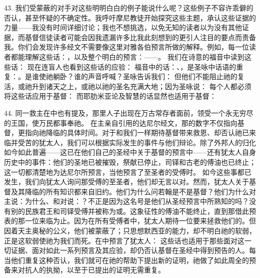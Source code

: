 43. 我们受蒙蔽的对手对这些明明白白的例子能说什么呢？这些例子不容许乖僻的否认，甚至怀疑的不确定性。我呼吁摩尼教徒开始探究这些主题，承认这些证据的力量——我没有时间详细讨论；我也不想挑选，以免无知的读者以为没有其他证据，而基督信徒读者可能会因我遗漏许多比我此刻想到的更引人注目的要点而责备我。你们会发现许多经文不需要像这里对雅各伯预言所做的解释。例如，每一位读者都能理解这些话：，以及整个明白的预言：——。 我们在诗意的福音中读到这些话： 现在连盲人也看到这些话的应验： 福音中的话：、，是圣咏中话语的重复：。是谁使祂躺卧？谁的声音呼喊？圣咏告诉我们： 但他们不能阻止祂的复活，或祂升到诸天之上，或祂以祂的圣名充满大地；因为圣咏说： 每个人都必须将这些话应用于基督： 而耶肋米亚论及智慧的话显然也适用于基督：\par

44. 同一救主在中也有提及，那里人子出现在万古常存者面前，领受一个永无穷尽的王国，使万民都事奉祂。 在主亲自引用的达尼尔经文，那的数字不仅指向基督，更指向祂降临的具体时间。对于和我们一样期待基督带来救恩、却否认祂已来临并受苦的犹太人，我们可以根据实际发生的事件与他们辩论。除了外邦人的归化如今如此普遍——这已在他们自己的圣经中关于基督的预言中——还有犹太人自身历史中的事件：他们的圣地已被摧毁，祭献已停止，司铎和古老的傅油也已终止；这一切都清楚地为达尼尔所预言，当他预言了至圣者的受傅时。 如今这些事都已发生，我们向犹太人询问那受傅的至圣者，他们却无言以对。然而，犹太人关于基督及其降临的所有知识都来自旧约。他们为什么问若翰是不是基督？他们为什么对主说：为什么、和对说：？不正是因为这名号是他们从圣经预言中所熟知的吗？没有别的民族君王和司铎受傅并被称为或。这象征性的傅油不能终止，直到那借此预表的那一位来临为止。因为在所有受傅者中，犹太人期待一位要来拯救他们的。但因着天主奥秘的公义，他们被蒙蔽了；只思想默西亚的能力，却不明白祂的软弱，正是这软弱使祂为我们而死。在中预言了犹太人： 这些话也适用于那些面对这一切证据、面对如此一系列预言及其应验，却仍否认基督在圣经中得到预告的人。每当他们重复这种否认，我们就可在祂的帮助下提出新的证明，祂做了如此周全的预备来对抗人的执拗，以至于已提出的证明无需重复。\par


